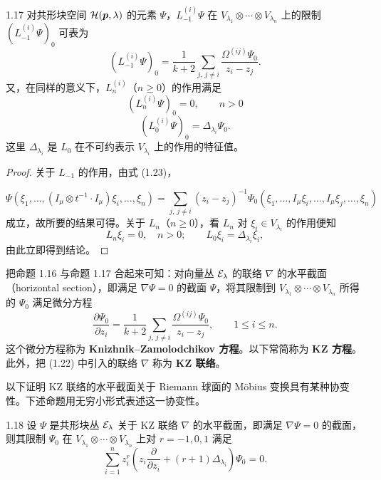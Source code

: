 \begin{proposition*}{1.17}
  对共形块空间 $\mathcal{H}(\bm{p},\lambda)$ 的元素 $\Psi$，$L_{-1}^{(i)}\Psi$ 在 $V_{\lambda_1}\otimes\cdots\otimes V_{\lambda_n}$ 上的限制 $(L_{-1}^{(i)}\Psi)_0$ 可表为
  \[
  (L_{-1}^{(i)}\Psi)_0=\frac{1}{k+2}\sum_{j,\,j\ne i}\frac{\Omega^{(ij)}\Psi_0}{z_i-z_j} .
  \]
  又，在同样的意义下，$L_{n}^{(i)}$（$n\ge 0$）的作用满足
  \begin{equation}
    (L_{n}^{(i)}\Psi)_0=0,\qquad n>0 \tag{1.24}
  \end{equation}
  \begin{equation}
    (L_{0}^{(i)}\Psi)_0=\Delta_{\lambda_i}\Psi_0 . \tag{1.25}
  \end{equation}
  这里 $\Delta_{\lambda_i}$ 是 $L_0$ 在不可约表示 $V_{\lambda_i}$ 上的作用的特征值。
\end{proposition*}

\begin{proof}
  关于 $L_{-1}$ 的作用，由式 (1.23)，


  \[
  \Psi(\xi_1,\dots,(I_\mu\otimes t^{-1}\cdot I_\mu)\xi_i,\dots,\xi_n)
  =\sum_{j,\,j\ne i}(z_i-z_j)^{-1}\Psi_0(\xi_1,\dots,I_\mu\xi_i,\dots,I_\mu\xi_j,\dots,\xi_n)
  \]
  成立，故所要的结果可得。关于 $L_n$（$n\ge 0$），看 $L_n$ 对 $\xi_i\in V_{\lambda_i}$ 的作用便知
  \[
  L_n\xi_i=0,\quad n>0;\qquad L_0\xi_i=\Delta_{\lambda_i}\xi_i ,
  \]
  由此立即得到结论。
\end{proof}

把命题 1.16 与命题 1.17 合起来可知：对向量丛 $\mathcal{E}_\lambda$ 的联络 $\nabla$ 的水平截面（horizontal section），即满足 $\nabla\Psi=0$ 的截面 $\Psi$，将其限制到 $V_{\lambda_1}\otimes\cdots\otimes V_{\lambda_n}$ 所得的 $\Psi_0$ 满足微分方程
\[
\frac{\partial\Psi_0}{\partial z_i}=\frac{1}{k+2}\sum_{j,\,j\ne i}\frac{\Omega^{(ij)}\Psi_0}{z_i-z_j},
\qquad 1\le i\le n .
\]
这个微分方程称为 \textbf{Knizhnik--Zamolodchikov 方程}。以下常简称为 \textbf{KZ 方程}。此外，把 (1.22) 中引入的联络 $\nabla$ 称为 \textbf{KZ 联络}。


以下证明 KZ 联络的水平截面关于 Riemann 球面的 Möbius 变换具有某种协变性。下述命题用无穷小形式表述这一协变性。

\begin{proposition*}{1.18}
  设 $\Psi$ 是共形块丛 $\mathcal{E}_\lambda$ 关于 KZ 联络 $\nabla$ 的水平截面，即满足 $\nabla\Psi=0$ 的截面，则其限制 $\Psi_0$ 在 $V_{\lambda_1}\otimes\cdots\otimes V_{\lambda_n}$ 上对 $r=-1,0,1$ 满足
  \[
  \sum_{i=1}^{n}z_i^{r}\left(z_i\frac{\partial}{\partial z_i}+(r+1)\Delta_{\lambda_i}\right)\Psi_0=0 .
  \]
\end{proposition*}


